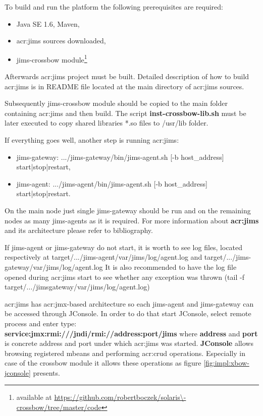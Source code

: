 \documentclass[11pt,openany]{book}
\begin{document}
      To build and run the platform the following prerequisites are required:

      \begin{itemize}
        \item Java SE 1.6, Maven,
        \item \gls{acr:jims} sources downloaded,
        \item jims-crossbow module\footnote{available at \url{https://github.com/robertboczek/solaris\-crossbow/tree/master/code}}
      \end{itemize}

      Afterwards \gls{acr:jims} project must be built. Detailed description of how to build \gls{acr:jims} is in README
      file located at the main directory of \gls{acr:jims} sources.

      Subsequently jims-crossbow module should be copied to the main folder containing \gls{acr:jims} and then build. The script
      \textbf{inst-crossbow-lib.sh} must be	later executed to copy shared libraries *.so files to /usr/lib folder.

      If everything goes well, another step is running \gls{acr:jims}:

      \begin{itemize}
        \item jims-gateway: .../jims-gateway/bin/jims-agent.sh [-b host\_address] start|stop|restart,
        \item jims-agent: .../jims-agent/bin/jims-agent.sh [-b host\_address] start|stop|restart.
      \end{itemize}

      On the main node just single jims-gateway should be run and on the remaining nodes as many jims-agents as it is
      required. For more information about \textbf{\gls{acr:jims}} and its architecture please refer to bibliography.

      If jims-agent or jims-gateway do not start, it is worth to see log files, located respectively at
      target/.../jims-agent/var/jims/log/agent.log and target/.../jims-gateway/var/jims/log/agent.log It is also
      recommended to have the log file opened during \gls{acr:jims} start to see whether any exception was thrown (tail
      -f target/.../jims\-gateway/var/jims/log/agent.log)

      \gls{acr:jims} has \gls{acr:jmx}-based architecture so each jims-agent and jims-gateway can be accessed through
      JConsole. In order to do that start JConsole, select remote process and enter type: \\
      \textbf{service:jmx:rmi:///jndi/rmi://address:port/jims} where \textbf{address} and \textbf{port} is concrete
      address and port under which \gls{acr:jims} was started. \textbf{JConsole} allows browsing registered mbeans and
      performing \gls{acr:crud} operations. Especially in case of the crossbow module it allows these operations as
      figure \ref{fig:impl:xbow-jconsole} presents.
\end{document}
